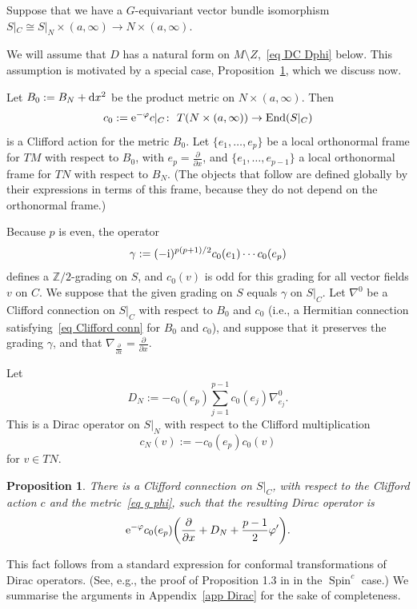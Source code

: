 \documentclass[10pt,a4paper]{amsart}
\numberwithin{equation}{section}
\newtheorem{Proposition}[Theorem]{Proposition}
 { \theoremstyle{definition}
\newtheorem{Definition}[Theorem]{Definition}
\newtheorem{Note}[Theorem]{Note}
\newtheorem{Example}[Theorem]{Example}
\newtheorem{Remark}[Theorem]{Remark} }
\DeclareMathOperator{\End}{End}
\DeclareMathOperator{\Spin}{Spin}
\newcommand{\Spinc}{\Spin^c}
\newcommand{\Z}{\mathbb{Z}}
\begin{document}
Suppose that we have a $G$-equivariant vector bundle isomorphism $S|_{C} \cong S|_N \times (a,\infty) \to N \times (a, \infty)$.

We will assume that $D$ has a natural form on $M\setminus Z$,~\eqref{eq DC Dphi} below.
This assumption is motivated by a special case, Proposition~\ref{prop Dphi}, which we discuss now.

Let $B_0 := B_N + {\rm d}x^2$ be the product metric on $N \times (a,\infty)$.
Then
\[
c_0:= {\rm e}^{-\varphi} c|_{C}\colon\ T(N \times (a,\infty)) \to \End(S|_{C})
\]
is a Clifford action for the metric $B_0$. Let $\{e_1,\dots, e_p\}$ be a local orthonormal frame for $TM$ with respect to $B_0$, with $e_p = \frac{\partial}{\partial x}$, and $\{e_1,\dots, e_{p-1}\}$ a local orthonormal frame for $TN$ with respect to $B_N$. (The objects that follow are defined globally by their expressions in terms of this frame, because they do not depend on the orthonormal frame.)

Because $p$ is even, the operator
\[
\gamma := (-{\rm i})^{p(p+1)/2} c_0(e_1) \cdots c_0(e_p)
\]
defines a $\Z/2$-grading
on $S$, and $c_0(v)$ is odd for this grading for all vector fields $v$ on $C$. We suppose that the given grading on $S$ equals $\gamma$ on $S|_C$.
Let $\nabla^0$ be a Clifford connection on $S|_C$ with respect to $B_0$ and $c_0$ (i.e., a Hermitian connection satisfying~\eqref{eq Clifford conn} for $B_0$ and $c_0$), and suppose that it preserves the grading $\gamma$, and that $\nabla_{\frac{\partial}{\partial x}} = \frac{\partial}{\partial x}$.

Let
\[
D_N := -c_0(e_p) \sum_{j=1}^{p-1}c_0(e_j) \nabla^0_{e_j}.
\]
This is a Dirac operator on $S|_N$ with respect to the Clifford multiplication
\[
c_N(v) := -c_0(e_p)c_0(v)
\]
for $v \in TN$.

\begin{Proposition}\label{prop Dphi}
There is a Clifford connection on $S|_C$, with respect to the Clifford action $c$ and the metric~\eqref{eq g phi},
 such that the resulting Dirac operator is
\begin{equation} \label{eq Dphi}
{\rm e}^{-\varphi} c_0(e_p)\bigg(\frac{\partial}{\partial x}+D_N +\frac{p-1}{2}\varphi' \bigg).
\end{equation}
\end{Proposition}

This fact follows from a standard expression for conformal transformations of Dirac operators. (See, e.g., the proof of Proposition 1.3 in \cite{Hitchin74} in the $\Spinc$ case.) We summarise the arguments in Appendix~\ref{app Dirac} for the sake of completeness.
\end{document}
